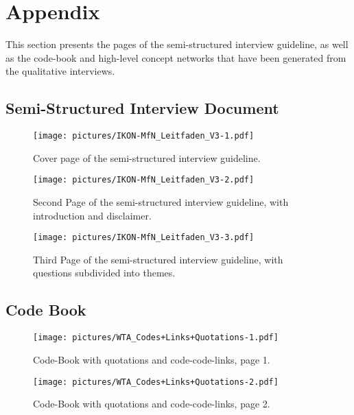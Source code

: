 \documentclass{article}
\begin{document}



\newpage

\section{Appendix}
This section presents the pages of the semi-structured interview guideline, as well as the code-book and high-level concept networks that have been generated from the qualitative interviews.

\subsection{Semi-Structured Interview Document}

\begin{figure*}[h!]
  \centering
  \texttt{[image: pictures/IKON-MfN\_Leitfaden\_V3-1.pdf]}
  \caption{\label{fig:firstpage}%
           Cover page of the semi-structured interview guideline.}
\end{figure*}

\begin{figure*}[h!]
  \centering
  \texttt{[image: pictures/IKON-MfN\_Leitfaden\_V3-2.pdf]}
  \caption{\label{fig:secpage}%
           Second Page of the semi-structured interview guideline, with introduction and disclaimer.}
\end{figure*}

\begin{figure*}[h!]
  \centering
  \texttt{[image: pictures/IKON-MfN\_Leitfaden\_V3-3.pdf]}
  \caption{\label{fig:thirpage}%
           Third Page of the semi-structured interview guideline, with questions subdivided into themes.}
\end{figure*}

\subsection{Code Book}

\begin{figure*}[h!]
  \centering
  \texttt{[image: pictures/WTA\_Codes+Links+Quotations-1.pdf]}
  \caption{\label{fig:WTApage1}%
           Code-Book with quotations and code-code-links, page 1.}
\end{figure*}

\begin{figure*}[h!]
  \centering
  \texttt{[image: pictures/WTA\_Codes+Links+Quotations-2.pdf]}
  \caption{\label{fig:WTApage2}%
           Code-Book with quotations and code-code-links, page 2.}
\end{figure*}
\end{document}
